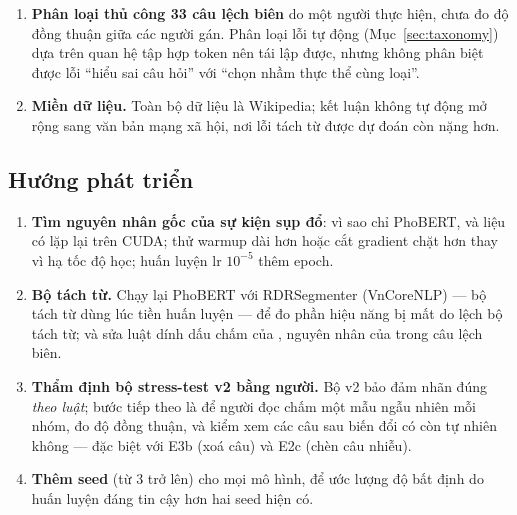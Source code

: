 \begin{enumerate}
        bản thật: xoá một câu có thể làm đoạn văn mất mạch, và câu hỏi bỏ dấu không phải lúc nào cũng giống
        cách người dùng thật gõ thiếu dấu. Kết luận từ các nhóm này nói về \emph{độ bền dưới phép biến đổi},
        không trực tiếp về hiệu năng trên dữ liệu tự nhiên tương ứng.
  \item \textbf{Phân loại thủ công 33 câu lệch biên} do một người thực hiện, chưa đo độ đồng thuận giữa
        các người gán. Phân loại lỗi tự động (Mục~\ref{sec:taxonomy}) dựa trên quan hệ tập hợp token nên
        tái lập được, nhưng không phân biệt được lỗi ``hiểu sai câu hỏi'' với ``chọn nhầm thực thể cùng loại''.
  \item \textbf{Miền dữ liệu.} Toàn bộ dữ liệu là Wikipedia; kết luận không tự động mở rộng sang văn bản
        mạng xã hội, nơi lỗi tách từ được dự đoán còn nặng hơn.
\end{enumerate}

\subsection{Hướng phát triển}
\label{sec:future}

\begin{enumerate}
  \item \textbf{Tìm nguyên nhân gốc của sự kiện sụp đổ}: vì sao chỉ PhoBERT, và liệu có lặp lại trên CUDA;
        thử warmup dài hơn hoặc cắt gradient chặt hơn thay vì hạ tốc độ học; huấn luyện lr $10^{-5}$ thêm epoch.
  \item \textbf{Bộ tách từ.} Chạy lại PhoBERT với RDRSegmenter (VnCoreNLP) --- bộ tách từ dùng lúc tiền
        huấn luyện --- để đo phần hiệu năng bị mất do lệch bộ tách từ; và sửa luật dính dấu chấm của
        , nguyên nhân của \MisPeriod{} trong \SegMis{} câu lệch biên.
  \item \textbf{Thẩm định bộ stress-test v2 bằng người.} Bộ v2 bảo đảm nhãn đúng \emph{theo luật}; bước
        tiếp theo là để người đọc chấm một mẫu ngẫu nhiên mỗi nhóm, đo độ đồng thuận, và kiểm xem các câu
        sau biến đổi có còn tự nhiên không --- đặc biệt với E3b (xoá câu) và E2c (chèn câu nhiễu).
  \item \textbf{Thêm seed} (từ 3 trở lên) cho mọi mô hình, để ước lượng độ bất định do huấn luyện đáng tin
        cậy hơn hai seed hiện có.
\end{enumerate}
